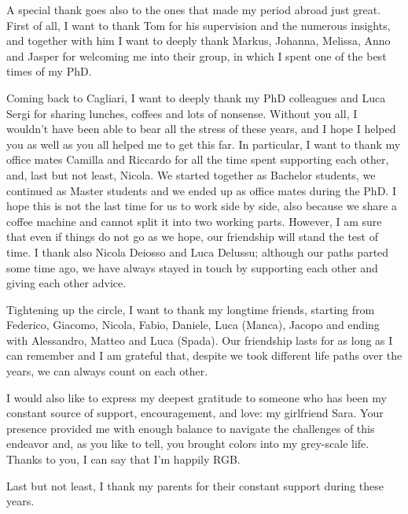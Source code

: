 \documentclass[a4paper, 12pt, twoside, openright]{book}
\begin{document}
A special thank goes also to the ones that made my period abroad just great. First of all, I want to thank Tom for his supervision and the numerous insights, and together with him I want to deeply thank Markus, Johanna, Melissa, Anno and Jasper for welcoming me into their group, in which I spent one of the best times of my PhD.

Coming back to Cagliari, I want to deeply thank my PhD colleagues and Luca Sergi for sharing lunches, coffees and lots of nonsense. Without you all, I wouldn't have been able to bear all the stress of these years, and I hope I helped you as well as you all helped me to get this far. In particular, I want to thank my office mates Camilla and Riccardo for all the time spent supporting each other, and, last but not least, Nicola. We started together as Bachelor students, we continued as Master students and we ended up as office mates during the PhD. I hope this is not the last time for us to work side by side, also because we share a coffee machine and cannot split it into two working parts. However, I am sure that even if things do not go as we hope, our friendship will stand the test of time. I thank also Nicola Deiosso and Luca Delussu; although our paths parted some time ago, we have always stayed in touch by supporting each other and giving each other advice.

Tightening up the circle, I want to thank my longtime friends, starting from Federico, Giacomo, Nicola, Fabio, Daniele, Luca (Manca), Jacopo and ending with Alessandro, Matteo and Luca (Spada). Our friendship lasts for as long as I can remember and I am grateful that, despite we took different life paths over the years, we can always count on each other.

I would also like to express my deepest gratitude to someone who has been my constant source of support, encouragement, and love: my girlfriend Sara. Your presence provided me with enough balance to navigate the challenges of this endeavor and, as you like to tell, you brought colors into my grey-scale life. Thanks to you, I can say that I'm happily RGB.

Last but not least, I thank my parents for their constant support during these years.









\appendix

\fancyfoot[C]{\thepage}
\end{document}
